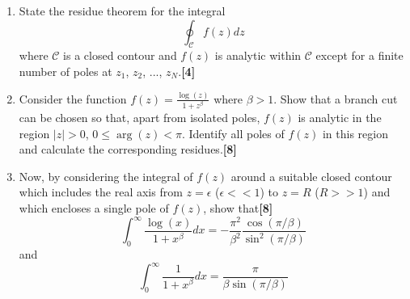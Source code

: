 \documentclass[a4paper]{article}
\begin{document}
\newpage
\begin{qns}\leavevmode
\begin{enumerate}[label=(\roman*)]
\item State the residue theorem for the integral
$$\oint_{\mathcal{C}}f(z)dz$$
where $\mathcal{C}$ is a closed contour and $f(z)$ is analytic within $\mathcal{C}$ except for a finite number of poles at $z_1$, $z_2$, ..., $z_N$.\hfill\textbf{[4]}
\item Consider the function $f(z)=\frac{\log(z)}{1+z^\beta}$ where $\beta>1$. Show that a branch cut can be chosen so that, apart from isolated poles, $f(z)$ is analytic in the region $|z| > 0$, $0\leq\arg(z)<\pi$. Identify all poles of $f(z)$ in this region and calculate the corresponding residues.\hfill\textbf{[8]}
\item Now, by considering the integral of $f(z)$ around a suitable closed contour which includes the real axis from $z=\epsilon$ ($\epsilon<<1$) to $z=R$ ($R>>1$) and which encloses a single pole of $f(z)$, show that\hfill\textbf{[8]}
$$\int_0^\infty\frac{\log(x)}{1+x^\beta}dx=-\frac{\pi^2}{\beta^2}\frac{\cos(\pi/\beta)}{\sin^2(\pi/\beta)}$$
and
$$\int_0^\infty\frac{1}{1+x^\beta}dx=\frac{\pi}{\beta\sin(\pi/\beta)}$$
\end{enumerate}
\end{qns}
\end{document}

